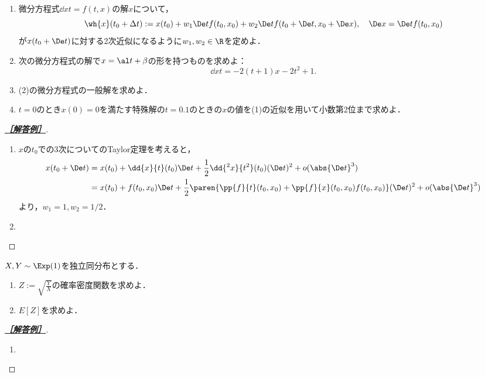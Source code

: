 \documentclass[uplatex,dvipdfmx]{jsarticle}
\begin{document}
\begin{tcolorbox}[colframe=ForestGreen, colback=ForestGreen!10!white,breakable,colbacktitle=ForestGreen!40!white,coltitle=black,fonttitle=\bfseries\sffamily,
    title=第３問]
    \begin{enumerate}
        \item 微分方程式$\dd{x}{t}=f(t,x)$の解$x$について，
        \[\wh{x}(t_0+\Delta t):=x(t_0)+w_1\De tf(t_0,x_0)+w_2\De tf(t_0+\De t,x_0+\De x),\quad\De x=\De tf(t_0,x_0)\]
        が$x(t_0+\De t)$に対する2次近似になるように$w_1,w_2\in\R$を定めよ．
        \item 次の微分方程式の解で$x=\al t+\beta$の形を持つものを求めよ：
        \[\dd{x}{t}=-2(t+1)x-2t^2+1.\]
        \item (2)の微分方程式の一般解を求めよ．
        \item $t=0$のとき$x(0)=0$を満たす特殊解の$t=0.1$のときの$x$の値を(1)の近似を用いて小数第2位まで求めよ．
    \end{enumerate}
\end{tcolorbox}
\begin{proof}[\textbf{\underline{［解答例］}}]\mbox{}
    \begin{enumerate}
        \item $x$の$t_0$での3次についてのTaylor定理を考えると，
        \begin{align*}
            x(t_0+\De t)&=x(t_0)+\dd{x}{t}(t_0)\De t+\frac{1}{2}\dd{^2x}{t^2}(t_0)(\De t)^2+o(\abs{\De t}^3)\\
            &=x(t_0)+f(t_0,x_0)\De t+\frac{1}{2}\paren{\pp{f}{t}(t_0,x_0)+\pp{f}{x}(t_0,x_0)f(t_0,x_0)}(\De t)^2+o(\abs{\De t}^3)
        \end{align*}
        より，$w_1=1,w_2=1/2$．
        \item 
    \end{enumerate}
\end{proof}

\begin{tcolorbox}[colframe=ForestGreen, colback=ForestGreen!10!white,breakable,colbacktitle=ForestGreen!40!white,coltitle=black,fonttitle=\bfseries\sffamily,
    title=第４問]
    $X,Y\sim\Exp(1)$を独立同分布とする．
    \begin{enumerate}
        \item $Z:=\sqrt{\frac{Y}{X}}$の確率密度関数を求めよ．
        \item $E[Z]$を求めよ．
    \end{enumerate}
\end{tcolorbox}
\begin{proof}[\textbf{\underline{［解答例］}}]\mbox{}
    \begin{enumerate}
        \item 
    \end{enumerate}
\end{proof}
\end{document}
